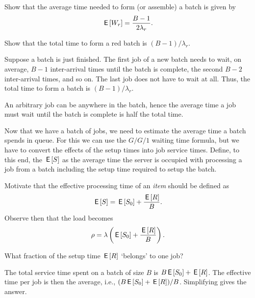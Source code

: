 \begin{exercise}
  Show that the average time needed to form (or assemble) a batch is given by
\begin{equation}\label{eq:79}
 \,\mathsf{E}\left[W_r\right] = \frac{B-1}{2\lambda_r}.
\end{equation}
\begin{hint}
 Show that the total time to form a red batch is $(B-1)/\lambda_r$. 
\end{hint}
\begin{solution}
 Suppose a batch is just finished. The first job of a new batch needs to wait, on average, $B-1$ inter-arrival times until the batch is complete, the second $B-2$ inter-arrival times, and so on. The last job does not have to wait at all. Thus, the total time to form a batch is $(B-1)/\lambda_r$. 

An arbitrary job can be anywhere in the batch, hence the average time a job must wait until the batch is complete is half the total time. 
\end{solution}
\end{exercise}

Now that we have a batch of jobs, we need to estimate the average time a batch spends in queue.
For this we can use the $G/G/1$ waiting time formula, but we have to convert the effects of the setup times into job service times.
Define, to this end, the  $\,\mathsf{E}\left[S\right]$ as the average time the server is occupied with processing a job from a batch including the setup time required to setup the batch.

\begin{exercise}
  Motivate that the effective processing time of an \emph{item} should be defined as
\begin{equation}\label{eq:81}
 \,\mathsf{E}\left[S\right] = \,\mathsf{E}\left[S_0\right] + \frac{\,\mathsf{E}\left[R\right]} B.
\end{equation}
Observe then that the load becomes
\begin{equation*}
\rho = \lambda \left(\,\mathsf{E}\left[S_0\right] + \frac{\,\mathsf{E}\left[R\right]}B\right).
\end{equation*}
\begin{hint}
 What fraction of the setup time $\,\mathsf{E}\left[R\right]$ `belongs' to one job?
\end{hint}
\begin{solution}
  The total service time spent on a batch of size $B$ is $B \,\mathsf{E}\left[S_0\right] + \,\mathsf{E}\left[R\right]$.
  The effective time per job is then the average, i.e., $(B \,\mathsf{E}\left[S_0\right]+\,\mathsf{E}\left[R\right])/B$.
  Simplifying gives the answer.
\end{solution}
\end{exercise}

